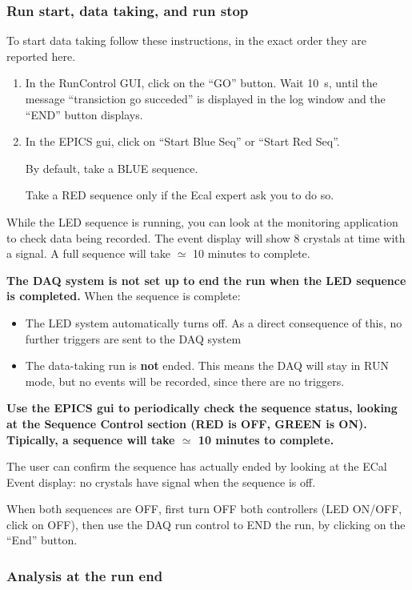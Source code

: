 \documentclass[12pt]{article}
\begin{document}
\subsubsection{Run start, data taking, and run stop}
To start data taking follow these instructions, in the exact order they are reported here.
\begin{enumerate}
\item In the RunControl GUI, click on the ``GO'' button. Wait 10~s, until the message ``transiction go succeded'' is displayed in the log window and the ``END'' button displays. 
\item In the EPICS gui, click on ``Start Blue Seq'' or ``Start Red Seq''.

By default, take a BLUE sequence. 

Take a RED sequence only if the Ecal expert ask you to do so.
\end{enumerate}

While the LED sequence is running, you can look at the monitoring application to check data being recorded. The event display will show 8 crystals at time with a signal. A full sequence will take $\simeq$ 10 minutes to complete.

{\bf  The DAQ system is not set up to end the run when the LED sequence is completed.} When the sequence is complete:
\begin{itemize}
\item The LED system automatically turns off. As a direct consequence of this, no further triggers are sent to the DAQ system
\item The data-taking run is \textbf{not} ended. This means the DAQ will stay in RUN mode, but no events will be recorded, since there are no triggers.
\end{itemize}
{\bf
Use the EPICS gui to periodically check the sequence status, looking at the Sequence Control section (RED is OFF, GREEN is ON). Tipically, a sequence will take $\simeq$ 10 minutes to complete.}

The user can confirm the sequence has actually ended by looking at the ECal Event display: no crystals have signal when the sequence is off.

When both sequences are OFF, first turn OFF both controllers (LED ON/OFF, click on OFF), 
then use the DAQ run control to END the run, by clicking on the ``End'' button.



\subsubsection{Analysis at the run end}
\end{document}
